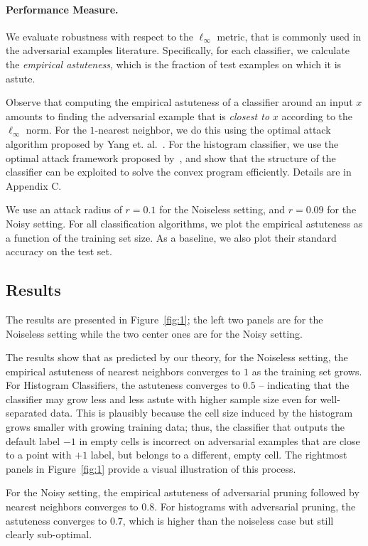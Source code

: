 \paragraph{Performance Measure.} We evaluate robustness with respect to the $\ell_{\infty}$ metric, that is commonly used in the adversarial examples literature. Specifically, for each classifier, we calculate the {\em{empirical astuteness}}, which is the fraction of test examples on which it is astute.

Observe that computing the empirical astuteness of a classifier around an input $x$ amounts to finding the adversarial example that is {\em{closest to}} $x$ according to the $\ell_{\infty}$ norm. For the $1$-nearest neighbor, we do this using the optimal attack algorithm proposed by Yang et. al.~\cite{YRWC19}. For the histogram classifier, we use the optimal attack framework proposed by~\cite{YRWC19}, and show that the structure of the classifier can be exploited to solve the convex program efficiently. Details are in Appendix C.

We use an attack radius of $r = 0.1$ for the Noiseless setting, and $r = 0.09$ for the Noisy setting. For all classification algorithms, we plot the empirical astuteness as a function of the training set size. As a baseline, we also plot their standard accuracy on the test set. 

\subsection{Results}

The results are presented in Figure~\ref{fig:1}; the left two panels are for the Noiseless setting while the two center ones are for the Noisy setting.  

The results show that as predicted by our theory, for the Noiseless setting, the empirical astuteness of nearest neighbors converges to $1$ as the training set grows. For Histogram Classifiers, the astuteness converges to $0.5$ -- indicating that the classifier may grow less and less astute with higher sample size even for well-separated data. This is plausibly because the cell size induced by the histogram grows smaller with growing training data; thus, the classifier that outputs the default label $-1$ in empty cells is incorrect on adversarial examples that are close to a point with $+1$ label, but belongs to a different, empty cell. The rightmost panels in Figure~\ref{fig:1} provide a visual illustration of this process. 

For the Noisy setting, the empirical astuteness of adversarial pruning followed by nearest neighbors converges to $0.8$. For histograms with adversarial pruning, the astuteness converges to $0.7$, which is higher than the noiseless case but still clearly sub-optimal.

